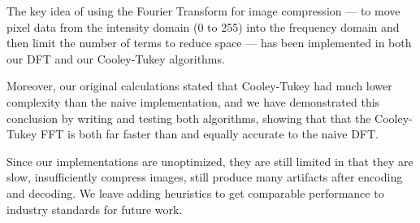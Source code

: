 
The key idea of using the Fourier Transform for image compression --- to move pixel data from the intensity domain (0 to 255) into the frequency domain and then limit the number of terms to reduce space --- has been implemented in both our DFT and our Cooley-Tukey algorithms.

Moreover, our original calculations stated that Cooley-Tukey had much lower complexity than the naive implementation, and we have demonstrated this conclusion by writing and testing both algorithms, showing that that the Cooley-Tukey FFT is both far faster than and equally accurate to the naive DFT.

Since our implementations are unoptimized, they are still limited in that they are slow, insufficiently compress images, still produce many artifacts after encoding and decoding. We leave adding heuristics to get comparable performance to industry standards for future work.
